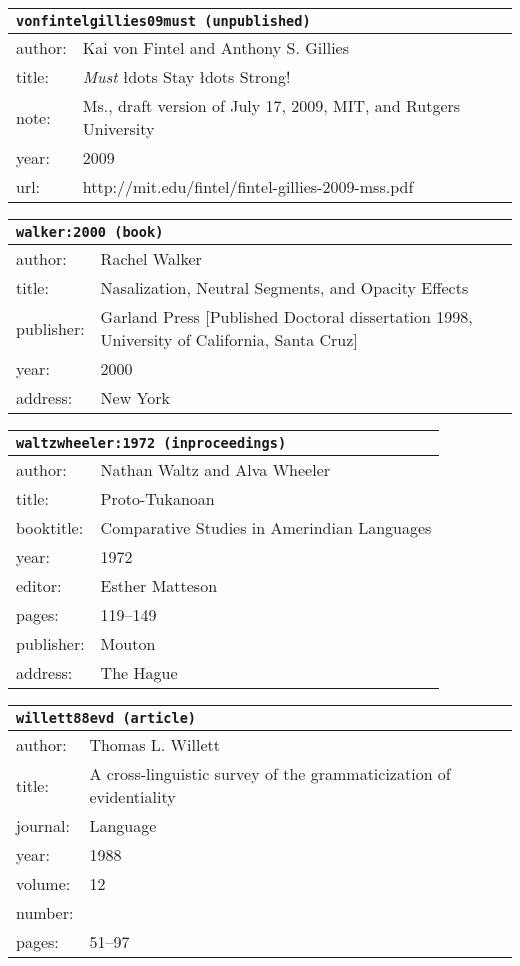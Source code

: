 \documentclass{article}
\begin{document}
\bigskip

\begin{tabular}{p{}p{}}
\multicolumn{2}{l}{\texttt{vonfintelgillies09must (unpublished)}}\\
\hline
author: & Kai {von Fintel} and Anthony S. Gillies\\
title: & \textsl{Must} {\l}dots Stay {\l}dots Strong!\\
note: & \textsc{M}s., draft version of July 17, 2009, MIT, and Rutgers University\\
year: & 2009\\
url: & http://mit.edu/fintel/fintel-gillies-2009-mss.pdf\\
\end{tabular}

\bigskip

\begin{tabular}{p{}p{}}
\multicolumn{2}{l}{\texttt{walker:2000 (book)}}\\
\hline
author: & Rachel Walker\\
title: & Nasalization, Neutral Segments, and Opacity Effects\\
publisher: & Garland Press [Published Doctoral dissertation 1998, University of California, Santa Cruz]\\
year: & 2000\\
address: & New York\\
\end{tabular}

\bigskip

\begin{tabular}{p{}p{}}
\multicolumn{2}{l}{\texttt{waltzwheeler:1972 (inproceedings)}}\\
\hline
author: & Nathan Waltz and Alva Wheeler\\
title: & Proto-Tukanoan\\
booktitle: & Comparative Studies in Amerindian Languages\\
year: & 1972\\
editor: & Esther Matteson\\
pages: & 119--149\\
publisher: & Mouton\\
address: & The Hague\\
\end{tabular}

\bigskip

\begin{tabular}{p{}p{}}
\multicolumn{2}{l}{\texttt{willett88evd (article)}}\\
\hline
author: & Thomas L. Willett\\
title: & A cross-linguistic survey of the grammaticization of evidentiality\\
journal: & Language\\
year: & 1988\\
volume: & 12\\
number: & \\
pages: & 51--97\\
\end{tabular}
\end{document}
